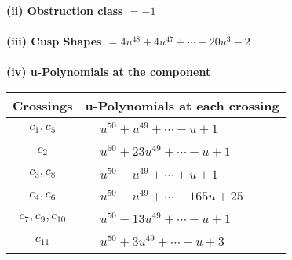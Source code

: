 \documentclass[1p]{elsarticle_modified}
\theoremstyle{definition}
\begin{document}
\flushleft \textbf{(ii) Obstruction class $= -1$}\\~\\
\flushleft \textbf{(iii) Cusp Shapes $= 4 u^{48}+4 u^{47}+\cdots-20 u^3-2$}\\~\\
\newpage\renewcommand{\arraystretch}{1}
\flushleft \textbf{(iv) u-Polynomials at the component}\newline \\
\begin{tabular}{m{50pt}|m{274pt}}
Crossings & \hspace{64pt}u-Polynomials at each crossing \\
\hline $$\begin{aligned}c_{1},c_{5}\end{aligned}$$&$\begin{aligned}
&u^{50}+u^{49}+\cdots- u+1
\end{aligned}$\\
\hline $$\begin{aligned}c_{2}\end{aligned}$$&$\begin{aligned}
&u^{50}+23 u^{49}+\cdots- u+1
\end{aligned}$\\
\hline $$\begin{aligned}c_{3},c_{8}\end{aligned}$$&$\begin{aligned}
&u^{50}- u^{49}+\cdots+u+1
\end{aligned}$\\
\hline $$\begin{aligned}c_{4},c_{6}\end{aligned}$$&$\begin{aligned}
&u^{50}- u^{49}+\cdots-165 u+25
\end{aligned}$\\
\hline $$\begin{aligned}c_{7},c_{9},c_{10}\end{aligned}$$&$\begin{aligned}
&u^{50}-13 u^{49}+\cdots- u+1
\end{aligned}$\\
\hline $$\begin{aligned}c_{11}\end{aligned}$$&$\begin{aligned}
&u^{50}+3 u^{49}+\cdots+u+3
\end{aligned}$\\
\hline
\end{tabular}\\~\\
\end{document}
